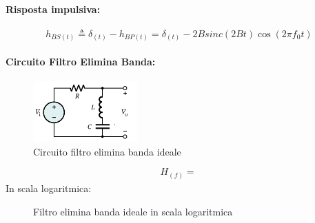             \paragraph{Risposta impulsiva:}
            \[
                h_{BS(t)}\triangleq \delta_{(t)} - h_{BP(t)} = \delta_{(t)} - 2Bsinc(2Bt) \cos(2\pi f_0t)
            \]

            \paragraph{Circuito Filtro Elimina Banda:}
                \begin{figure}[H]
                    \centering
                    \includegraphics[width=4cm]{media/Band-Reject_Filter.png}
                    \caption{Circuito filtro elimina banda ideale}
                    \label{fig:circuito filtro elimina banda ideale}
                \end{figure}
                \[
                    H_{(f)} = \frac{}{}  
                \]
            In scala logaritmica:
            \begin{figure}[H]
                \centering
                \caption{Filtro elimina banda ideale in scala logaritmica}
                \label{fig:BS filter logartithm}
            \end{figure}

